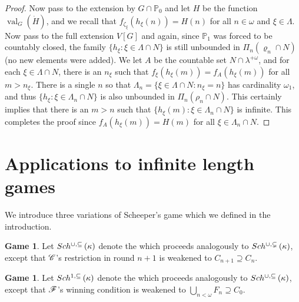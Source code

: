 \documentclass{amsart}
\theoremstyle{plain}
\theoremstyle{definition}
\newtheorem{game}[theorem]{Game}
\theoremstyle{remark}
\theoremstyle{plain}
\theoremstyle{definition}
\theoremstyle{remark}
\begin{document}
\begin{proof}
            Now pass to the extension by
                  $G\cap \mathbb P_0$ and let $H$ be the function
                   $\operatorname{val}_{G}(\dot H)$, and we recall
                   that $f_{\zeta_\xi}(h_\xi(n)) = H(n)$ for all $n\in \omega$
            and $\xi\in \Lambda$.
             Now pass to the full extension $V[G]$ and again, since
              $\mathbb P_1$ was forced to be countably closed,
               the family $\{ h_\xi : \xi \in \Lambda\cap N\}$ is still
               unbounded in $\Pi_n (\varrho_n \cap N)$ (no new elements
            were added). We let
               $A$ be the countable set $N\cap \lambda^{+\omega}$,
               and for  each
               $\xi\in \Lambda\cap N$, there is an $n_\xi$ such that
                $f_{\xi}(h_\xi(m)) = f_A(h_\xi(m))$ for all $m>n_\xi$.
                There is a single $n$ so that $\Lambda_n
                 = \{\xi\in \Lambda\cap N       : n_\xi = n\}$ has cardinality
                  $\omega_1 $, and thus
                  $\{ h_\xi : \xi\in \Lambda_n\cap N\}$ is also unbounded
                  in $\Pi_n (\rho_n\cap N)$.
            This certainly implies that there is an $m>n$
            such that $\{ h_\xi (m) : \xi\in \Lambda_n\cap N\}$ is infinite.
            This completes the proof since  $f_{A}(h_\xi(m)) = H(m)$
            for all $\xi\in \Lambda_n\cap N$.
            \end{proof}





  \section{Applications to infinite length games}

  We introduce three variations of Scheeper's game which we defined in
  the introduction.

  \begin{game}
    Let \(Sch^{\cup,\subseteq}\left({\kappa}\right)\) denote the
     which proceeds analogously
    to \(Sch^{\cup,\subsetneq}\left({\kappa}\right)\), except that \(\mathscr{C}\)'s restriction in round \(n+1\)
    is weakened to \(C_{n+1}\supseteq C_n\).
  \end{game}

  \begin{game}
    Let \(Sch^{1,\subseteq}\left({\kappa}\right)\) denote the
     which proceeds analogously
    to \(Sch^{\cup,\subseteq}\left({\kappa}\right)\), except that \(\mathscr{F}\)'s winning condition is
    weakened to \(\bigcup_{n<\omega}F_n\supseteq C_0\).
  \end{game}
\end{document}
